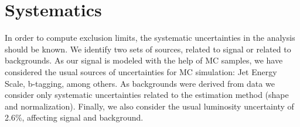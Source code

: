 \begin{table*}[htbH]
\begin{center}
\caption{Results of validation procedure of estimation of normalization. We start the validation after $\chi^{2}$ cut. All other cuts are applied progressively. The last line correspond to full selection, reason why $R^{SS}$ and $N^{SS}_{in}$ are blinded for the validation procedure. \label{tab:NormVal}}
\end{center}
\end{table*}

\section{Systematics}
\label{sec:sys}

In order to compute exclusion limits, the systematic uncertainties in the analysis should be known. We identify two sets of sources, related to signal or related to backgrounds. As our signal is modeled with the help of MC samples, we have considered the usual sources of uncertainties for MC simulation: Jet Energy Scale, b-tagging, among others. As backgrounds were derived from data we consider only systematic uncertainties related to the estimation method (shape and normalization). Finally, we also consider the usual luminosity uncertainty of 2.6\%, affecting signal and background. 

